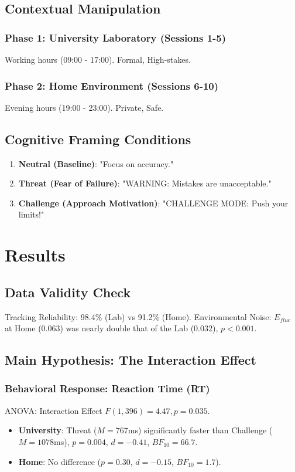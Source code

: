 \documentclass[journal]{IEEEtran}
\begin{document}
\subsection{Contextual Manipulation}
\subsubsection{Phase 1: University Laboratory (Sessions 1-5)}
Working hours (09:00 - 17:00). Formal, High-stakes.
\subsubsection{Phase 2: Home Environment (Sessions 6-10)}
Evening hours (19:00 - 23:00). Private, Safe.

\subsection{Cognitive Framing Conditions}
\begin{enumerate}
    \item \textbf{Neutral (Baseline)}: "Focus on accuracy."
    \item \textbf{Threat (Fear of Failure)}: "WARNING: Mistakes are unacceptable."
    \item \textbf{Challenge (Approach Motivation)}: "CHALLENGE MODE: Push your limits!"
\end{enumerate}

\section{Results}

\subsection{Data Validity Check}
Tracking Reliability: 98.4\% (Lab) vs 91.2\% (Home).
Environmental Noise: $E_{fluc}$ at Home ($0.063$) was nearly double that of the Lab ($0.032$), $p < 0.001$.

\subsection{Main Hypothesis: The Interaction Effect}
\subsubsection{Behavioral Response: Reaction Time (RT)}
ANOVA: Interaction Effect $F(1, 396) = 4.47, p = 0.035$.
\begin{itemize}
    \item \textbf{University}: Threat ($M=767$ms) significantly faster than Challenge ($M=1078$ms), $p = 0.004$, $d = -0.41$, $BF_{10} = 66.7$.
    \item \textbf{Home}: No difference ($p = 0.30$, $d = -0.15$, $BF_{10} = 1.7$).
\end{itemize}
\end{document}

